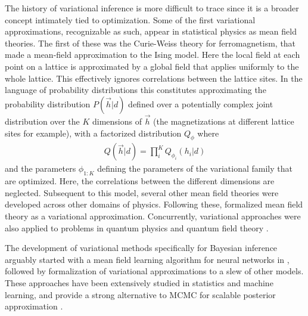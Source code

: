 The history of variational inference is more difficult to trace since it is a broader concept intimately tied to optimization. Some of the first variational approximations, recognizable as such, appear in statistical physics as mean field theories. The first of these was the Curie-Weiss theory for ferromagnetism, that made a mean-field approximation to the Ising model\cite{curie1895proprietes,  weiss1907hypothese}. Here the local field at each point on a lattice is approximated by a global field that applies uniformly to the whole lattice. This effectively ignores correlations between the lattice sites. In the language of probability distributions this constitutes approximating the probability distribution $P(\vec{h} | d)$ defined over a potentially complex joint distribution over the $K$ dimensions of $\vec{h}$ (the magnetizations at different lattice sites for example), with a factorized distribution $Q_\phi$ where
\begin{align}
Q(\vec{h}| d) = \prod_{i}^K Q_{\phi_i}(h_i | d)
\end{align}
and the parameters $\phi_{1:K}$ defining the parameters of the variational family that are optimized. Here, the correlations between the different dimensions are neglected. Subsequent to this model, several other mean field theories were developed across other domains of physics. Following these, \citet{landau1965collected} formalized mean field theory as a variational approximation\cite{kadanoff2009more}. Concurrently, variational approaches were also applied to problems in quantum physics and quantum field theory \citep{milton2006electromagnetic, feynman1965quantum}. 

The development of variational methods specifically for Bayesian inference arguably started with a mean field learning algorithm for neural networks in \citet{anderson1987mean}, followed by formalization of variational approximations to a slew of other models\citep{saul1996mean, jaakkola1997variational}. These approaches have been extensively studied in statistics and machine learning, and provide a strong alternative to MCMC for scalable posterior approximation \citep{blei2017variational, jordan1999introduction}.

